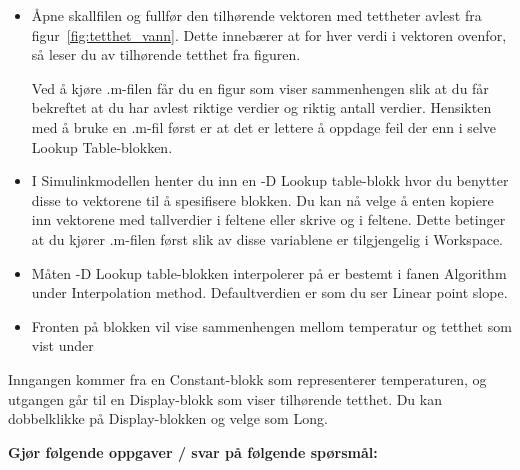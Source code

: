   \begin{itemize}
  \item Åpne skallfilen  og 
    fullfør den tilhørende vektoren  med tettheter avlest fra
    figur~\ref{fig:tetthet_vann}. Dette innebærer at for hver verdi i
    vektoren  ovenfor, så leser du av tilhørende tetthet fra
    figuren.

    Ved å kjøre .m-filen får du en figur som viser sammenhengen slik at du
    får bekreftet at du har avlest riktige verdier og riktig antall
    verdier. Hensikten med å bruke en .m-fil først er at det er lettere å
    oppdage feil der enn i selve {\sf Lookup Table}-blokken.   


  \item I Simulinkmodellen henter du inn en {-D Lookup table}-blokk
    hvor du benytter disse to
    vektorene til å spesifisere blokken. Du kan nå velge å enten
    kopiere inn vektorene med tallverdier i feltene
    eller skrive  og  i feltene. Dette
    betinger at du kjører .m-filen først slik av disse variablene er
    tilgjengelig i {\sf Workspace}.

  \item     Måten {-D Lookup table}-blokken interpolerer på er bestemt i fanen {\sf  Algorithm}
    under {\sf Interpolation method}. Defaultverdien er som du ser {\sf
      Linear point   slope}.

    
  \item   Fronten på blokken vil vise
    sammenhengen mellom temperatur og tetthet som vist under
    \begin{figure}[H]
      \centering
      \hspace*{0mm}
    \end{figure}

  \end{itemize}

    Inngangen kommer fra en {\sf  Constant}-blokk som representerer 
    temperaturen, og 
    utgangen går til 
    en {\sf  Display}-blokk som viser tilhørende
    tetthet. Du kan dobbelklikke på {\sf Display}-blokken og velge
     som {\sf Long}.   

    
  {\bf Gjør følgende oppgaver / svar på følgende spørsmål:    }
  
